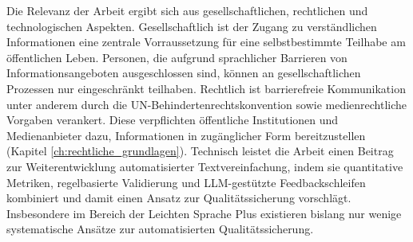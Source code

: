 Die Relevanz der Arbeit ergibt sich aus gesellschaftlichen, rechtlichen und technologischen Aspekten. 
Gesellschaftlich ist der Zugang zu verständlichen Informationen eine zentrale Vorraussetzung für eine selbstbestimmte Teilhabe am öffentlichen Leben. 
Personen, die aufgrund sprachlicher Barrieren von Informationsangeboten ausgeschlossen sind, können an gesellschaftlichen Prozessen nur eingeschränkt teilhaben.
Rechtlich ist barrierefreie Kommunikation unter anderem durch die UN-Behindertenrechtskonvention sowie medienrechtliche Vorgaben verankert.
Diese verpflichten öffentliche Institutionen und Medienanbieter dazu, Informationen in zugänglicher Form bereitzustellen (Kapitel \ref{ch:rechtliche_grundlagen}).
Technisch leistet die Arbeit einen Beitrag zur Weiterentwicklung automatisierter Textvereinfachung, indem sie quantitative Metriken, regelbasierte Validierung und LLM-gestützte Feedbackschleifen kombiniert und damit einen Ansatz zur Qualitätssicherung vorschlägt. 
Insbesondere im Bereich der Leichten Sprache Plus existieren bislang nur wenige systematische Ansätze zur automatisierten Qualitätssicherung.